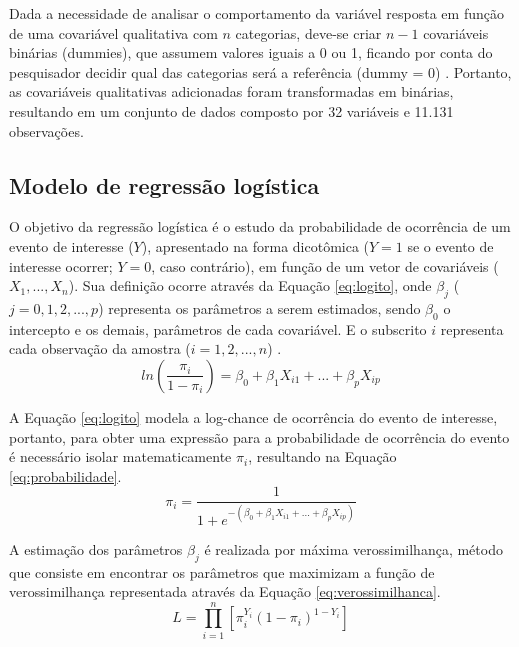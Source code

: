 \documentclass[twocolumn]{rbef}
\newcommand{\1}{\mathbbm{1}}
\begin{document}
Dada a necessidade de analisar o comportamento da variável resposta em função de uma covariável qualitativa com \(n\) categorias, deve-se criar \(n-1\) covariáveis binárias (dummies), que assumem valores iguais a 0 ou 1, ficando por conta do pesquisador decidir qual das categorias será a referência (dummy = 0) \cite{Favero2017}. Portanto, as covariáveis qualitativas adicionadas foram transformadas em binárias, resultando em um conjunto de dados composto por 32 variáveis e 11.131 observações.

\hypertarget{modelo-de-regressuxe3o-loguxedstica}{%
\subsection{Modelo de regressão logística}\label{modelo-de-regressuxe3o-loguxedstica}}

O objetivo da regressão logística é o estudo da probabilidade de ocorrência de um evento de interesse (\(Y\)), apresentado na forma dicotômica (\(Y=1\) se o evento de interesse ocorrer; \(Y=0\), caso contrário), em função de um vetor de covariáveis (\(X_1, ..., X_n\)). Sua definição ocorre através da Equação \eqref{eq:logito}, onde \(\beta_j\) (\(j = 0,1,2,...,p\)) representa os parâmetros a serem estimados, sendo \(\beta_0\) o intercepto e os demais, parâmetros de cada covariável. E o subscrito \(i\) representa cada observação da amostra (\(i = 1, 2,...,n\)) \cite{Favero2017}.
\begin{equation}
ln \left ( \dfrac{\pi_i}{1-\pi_i} \right ) = \beta_0 + \beta_1 X_{i1} + ... +  \beta_p X_{ip}\label{eq:logito}
\end{equation}

A Equação \eqref{eq:logito} modela a log-chance de ocorrência do evento de interesse, portanto, para obter uma expressão para a probabilidade de ocorrência do evento é necessário isolar matematicamente \(\pi_i\), resultando na Equação \eqref{eq:probabilidade}.
\begin{equation}
\pi_i = \dfrac{1}{1 + e^{-(\beta_0 + \beta_1 X_{i1} + ... +  \beta_p X_{ip})}}\label{eq:probabilidade}
\end{equation}

A estimação dos parâmetros \(\beta_j\) é realizada por máxima verossimilhança, método que consiste em encontrar os parâmetros que maximizam a função de verossimilhança representada através da Equação \eqref{eq:verossimilhanca}.
\begin{equation}
L =  \prod_{i=1}^{n} \left[ \pi_i^{Y_i} (1-\pi_i)^{1-Y_i} \right]\label{eq:verossimilhanca}
\end{equation}
\end{document}
